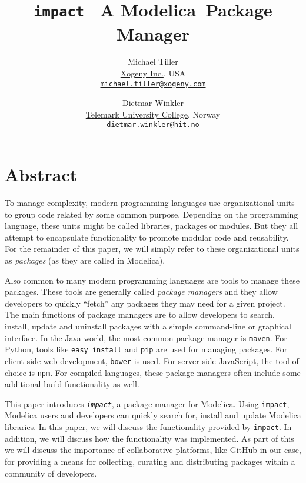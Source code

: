 \documentclass[11pt,a4paper,twocolumn]{article}
\newcommand{\myr}{\textsuperscript{\textregistered}}
\newcommand{\impact}{\texttt{impact}} %
\newcommand{\code}[1]{\texttt{#1}} %
\begin{document}
\title{\impact -- A Modelica\myr\ Package Manager}

\author{Michael Tiller\\
  \href{http://xogeny.com}{Xogeny Inc.}, USA\\
  \href{mailto:michael.tiller@xogeny.com}{\nolinkurl{michael.tiller@xogeny.com}} %
  \and Dietmar Winkler\\
  \href{http://www.hit.no}{Telemark University College}, Norway\\
  \href{mailto:dietmar.winkler@hit.no}{\nolinkurl{dietmar.winkler@hit.no}}}
\date{} %
\maketitle\thispagestyle{empty} %

\section*{Abstract}

To manage complexity, modern programming languages use organizational
units to group code related by some common purpose.  Depending on the
programming language, these units might be called libraries, packages
or modules.  But they all attempt to encapsulate functionality to
promote modular code and reusability.  For the remainder of this
paper, we will simply refer to these organizational units as
\emph{packages} (as they are called in Modelica).

Also common to many modern programming languages are tools to manage
these packages.  These tools are generally called \emph{package
  managers} and they allow developers to quickly ``fetch'' any
packages they may need for a given project.  The main functions of
package managers are to allow developers to search, install, update
and uninstall packages with a simple command-line or graphical
interface.  In the Java world, the most common package manager is
\code{maven}.  For Python, tools like
\code{easy\_install}\cite{easy_install} and \code{pip}\cite{pip} are
used for managing packages.  For client-side web development,
\code{bower} is used.  For server-side JavaScript, the tool of choice
is \code{npm}\cite{npm}.  For compiled languages, these package
managers often include some additional build functionality as well.

This paper introduces \emph{\impact}, a package manager for
Modelica. Using \impact, Modelica users and developers can quickly
search for, install and update Modelica libraries.  In this paper, we
will discuss the functionality provided by \impact.  In addition, we
will discuss how the functionality was implemented.  As part of this
we will discuss the importance of collaborative platforms, like
\href{https://github.com}{GitHub}\cite{github} in our case, for providing
a means for collecting, curating and distributing packages within a community
of developers.
\end{document}
